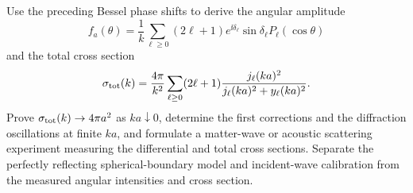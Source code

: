 \begin{exercise}
Use the preceding Bessel phase shifts to derive the angular amplitude
\[
 f_a(\theta)=\frac1k\sum_{\ell\geq0}(2\ell+1)
 e^{\ii\delta_\ell}\sin\delta_\ell P_\ell(\cos\theta)
\]
and the total cross section
\[
 \sigma_{\rm tot}(k)=\frac{4\pi}{k^2}
 \sum_{\ell\geq0}(2\ell+1)
 \frac{j_\ell(ka)^2}{j_\ell(ka)^2+y_\ell(ka)^2}.
\]
Prove $\sigma_{\rm tot}(k)\to4\pi a^2$ as $ka\downarrow0$, determine the
first corrections and the diffraction oscillations at finite $ka$, and
formulate a matter-wave or acoustic scattering experiment measuring the
differential and total cross sections.  Separate the perfectly reflecting
spherical-boundary model and incident-wave calibration from the measured
angular intensities and cross section.
\end{exercise}
